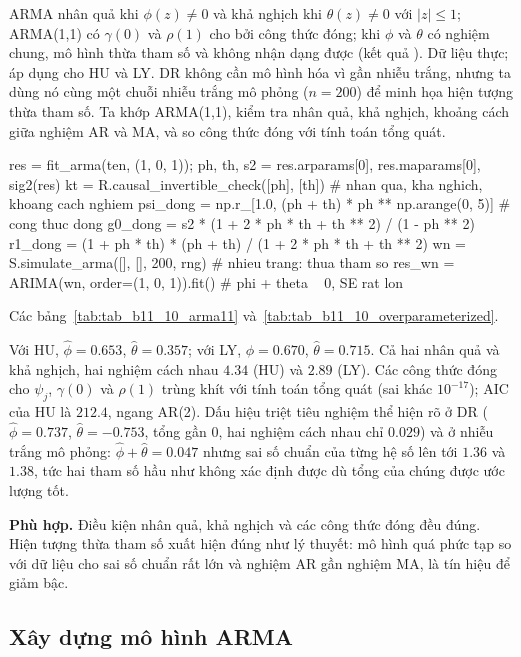  ARMA nhân quả khi $\phi(z)\ne0$ và khả nghịch khi $\theta(z)\ne0$ với $|z|\le1$; ARMA(1,1) có $\gamma(0)$ và $\rho(1)$ cho bởi công thức đóng; khi $\phi$ và $\theta$ có nghiệm chung, mô hình thừa tham số và không nhận dạng được (kết quả ).
 Dữ liệu thực; áp dụng cho HU và LY. DR không cần mô hình hóa vì gần nhiễu trắng, nhưng ta dùng nó cùng một chuỗi nhiễu trắng mô phỏng ($n=200$) để minh họa hiện tượng thừa tham số. Ta khớp ARMA(1,1), kiểm tra nhân quả, khả nghịch, khoảng cách giữa nghiệm AR và MA, và so công thức đóng với tính toán tổng quát.
\begin{codeblock}
res = fit_arma(ten, (1, 0, 1)); ph, th, s2 = res.arparams[0], res.maparams[0], sig2(res)
kt = R.causal_invertible_check([ph], [th])   # nhan qua, kha nghich, khoang cach nghiem
psi_dong = np.r_[1.0, (ph + th) * ph ** np.arange(0, 5)]       # cong thuc dong
g0_dong = s2 * (1 + 2 * ph * th + th ** 2) / (1 - ph ** 2)
r1_dong = (1 + ph * th) * (ph + th) / (1 + 2 * ph * th + th ** 2)
wn = S.simulate_arma([], [], 200, rng)                          # nhieu trang: thua tham so
res_wn = ARIMA(wn, order=(1, 0, 1)).fit()                       # phi + theta ~ 0, SE rat lon
\end{codeblock}
 Các bảng~\ref{tab:tab_b11_10_arma11} và~\ref{tab:tab_b11_10_overparameterized}.


 Với HU, $\hat\phi=0.653$, $\hat\theta=0.357$; với LY, $\hat\phi=0.670$, $\hat\theta=0.715$. Cả hai nhân quả và khả nghịch, hai nghiệm cách nhau $4.34$ (HU) và $2.89$ (LY). Các công thức đóng cho $\psi_j$, $\gamma(0)$ và $\rho(1)$ trùng khít với tính toán tổng quát (sai khác $10^{-17}$); AIC của HU là $212.4$, ngang AR(2). Dấu hiệu triệt tiêu nghiệm thể hiện rõ ở DR ($\hat\phi=0.737$, $\hat\theta=-0.753$, tổng gần $0$, hai nghiệm cách nhau chỉ $0.029$) và ở nhiễu trắng mô phỏng: $\hat\phi+\hat\theta=0.047$ nhưng sai số chuẩn của từng hệ số lên tới $1.36$ và $1.38$, tức hai tham số hầu như không xác định được dù tổng của chúng được ước lượng tốt.

 \textbf{Phù hợp.} Điều kiện nhân quả, khả nghịch và các công thức đóng đều đúng. Hiện tượng thừa tham số xuất hiện đúng như lý thuyết: mô hình quá phức tạp so với dữ liệu cho sai số chuẩn rất lớn và nghiệm AR gần nghiệm MA, là tín hiệu để giảm bậc.

\subsection{Xây dựng mô hình ARMA}

